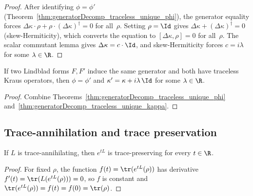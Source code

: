 \begin{proof}\leanok
    After identifying $\phi = \phi'$
    (Theorem~\ref{thm:generatorDecomp_traceless_unique_phi}),
    the generator equality forces
    $\Delta\kappa\cdot\rho+\rho\cdot(\Delta\kappa)^\dagger=0$
    for all~$\rho$. Setting $\rho=\Id$ gives
    $\Delta\kappa+(\Delta\kappa)^\dagger=0$
    (skew-Hermiticity), which converts the equation to
    $[\Delta\kappa,\rho]=0$ for all~$\rho$.
    The scalar commutant lemma gives $\Delta\kappa=c\cdot\Id$,
    and skew-Hermiticity forces $c=i\lambda$ for some $\lambda\in\R$.
\end{proof}

\begin{theorem}
    \label{thm:generatorDecomp_traceless_unique}
    \leanok
    If two Lindblad forms $F,F'$ induce the same generator and
    both have traceless Kraus operators, then $\phi=\phi'$ and
    $\kappa'=\kappa+i\lambda\,\Id$ for some $\lambda\in\R$.
\end{theorem}

\begin{proof}\leanok
    Combine Theorems~\ref{thm:generatorDecomp_traceless_unique_phi}
    and~\ref{thm:generatorDecomp_traceless_unique_kappa}.
\end{proof}

\subsection{Trace-annihilation and trace preservation}

\begin{theorem}
    \label{thm:ta_implies_tp_semigroup}
    \leanok
    If $L$ is trace-annihilating, then $e^{tL}$ is trace-preserving for every
    $t \in \R$.
\end{theorem}

\begin{proof}
    \leanok
    For fixed $\rho$, the function $f(t)=\tr(e^{tL}(\rho))$ has derivative
    $f'(t)=\tr(L(e^{tL}(\rho)))=0$, so $f$ is constant and
    $\tr(e^{tL}(\rho))=f(t)=f(0)=\tr(\rho)$.
\end{proof}

